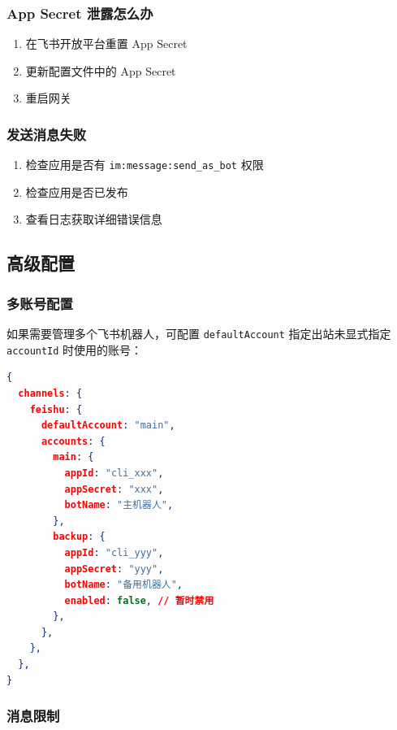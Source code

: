 \subsubsection{App Secret 泄露怎么办}


\begin{enumerate}
  \item 在飞书开放平台重置 App Secret
  \item 更新配置文件中的 App Secret
  \item 重启网关
\end{enumerate}


\subsubsection{发送消息失败}


\begin{enumerate}
  \item 检查应用是否有 \texttt{im:message:send\_as\_bot} 权限
  \item 检查应用是否已发布
  \item 查看日志获取详细错误信息
\end{enumerate}


\hrulefill


\subsection{高级配置}


\subsubsection{多账号配置}


如果需要管理多个飞书机器人，可配置 \texttt{defaultAccount} 指定出站未显式指定 \texttt{accountId} 时使用的账号：

\begin{lstlisting}[language=json]
{
  channels: {
    feishu: {
      defaultAccount: "main",
      accounts: {
        main: {
          appId: "cli_xxx",
          appSecret: "xxx",
          botName: "主机器人",
        },
        backup: {
          appId: "cli_yyy",
          appSecret: "yyy",
          botName: "备用机器人",
          enabled: false, // 暂时禁用
        },
      },
    },
  },
}
\end{lstlisting}


\subsubsection{消息限制}


